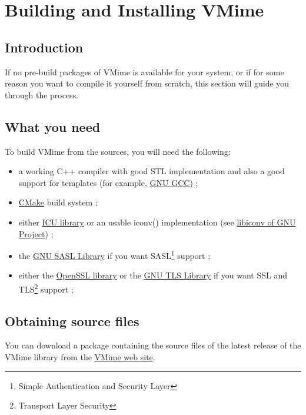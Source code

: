 \label{chapter_building}
\chapter{Building and Installing VMime}

\section{Introduction}

If no pre-build packages of VMime is available for your system, or if for some
reason you want to compile it yourself from scratch, this section will guide
you through the process.

\section{What you need}

To build VMime from the sources, you will need the following:

\begin{itemize}
\item a working C++ compiler with good STL implementation and also a good
support for templates (for example, \href{http://gcc.gnu.org/}{GNU GCC}) ;
\item \href{http://www.cmake.org/}{CMake} build system ;
\item either \href{http://www.icu-project.org}{ICU library} or an usable
{\vcode iconv()} implementation (see
\href{http://www.gnu.org/software/libiconv/}{libiconv of GNU Project}) ;
\item the \href{http://www.gnu.org/software/gsasl/}{GNU SASL Library} if you
want SASL\footnote{Simple Authentication and Security Layer} support ;
\item either the \href{http://www.openssl.org}{OpenSSL library} or the
\href{http://www.gnu.org/software/gnutls/}{GNU TLS Library} if you
want SSL and TLS\footnote{Transport Layer Security} support ;
\end{itemize}

\section{Obtaining source files}

You can download a package containing the source files of the latest release
of the VMime library from the \href{http://www.vmime.org/}{VMime web site}.

